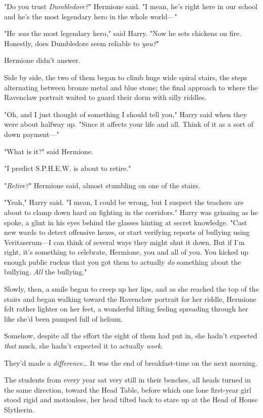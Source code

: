 "Do you trust \emph{Dumbledore?}" Hermione said. "I mean, he's right here in 
our school and he's the most legendary hero in the whole world---"

"He \emph{was} the most legendary hero," said Harry. "Now he sets chickens on 
fire. Honestly, does Dumbledore seem reliable to \emph{you?}"

Hermione didn't answer.

Side by side, the two of them began to climb huge wide spiral stairs, the steps 
alternating between bronze metal and blue stone; the final approach to where 
the Ravenclaw portrait waited to guard their dorm with silly riddles.

"Oh, and I just thought of something I should tell you," Harry said when they 
were about halfway up. "Since it affects your life and all. Think of it as a 
sort of down payment---"

"What is it?" said Hermione.

"I predict S.P.H.E.W. is about to retire."

"\emph{Retire?}" Hermione said, almost stumbling on one of the stairs.

"Yeah," Harry said. "I mean, I could be wrong, but I suspect the teachers are 
about to clamp down hard on fighting in the corridors." Harry was grinning as 
he spoke, a glint in his eyes behind the glasses hinting at secret knowledge. 
"Cast new wards to detect offensive hexes, or start verifying reports of 
bullying using Veritaserum---I can think of several ways they might shut it 
down. But if I'm right, it's something to celebrate, Hermione, you and all of 
you. You kicked up enough public ruckus that you got them to actually \emph{do} 
something about the bullying. \emph{All} the bullying."

Slowly, then, a smile began to creep up her lips, and as she reached the top of 
the stairs and began walking toward the Ravenclaw portrait for her riddle, 
Hermione felt rather lighter on her feet, a wonderful lifting feeling spreading 
through her like she'd been pumped full of helium.

Somehow, despite all the effort the eight of them had put in, she hadn't 
expected \emph{that} much, she hadn't expected it to actually \emph{work}.

They'd made a \emph{difference{\ldots}}
\sbreak
It was the end of breakfast-time on the next morning.

The students from every year sat very still in their benches, all heads turned 
in the same direction, toward the Head Table, before which one lone first-year 
girl stood rigid and motionless, her head tilted back to stare up at the Head 
of House Slytherin.

